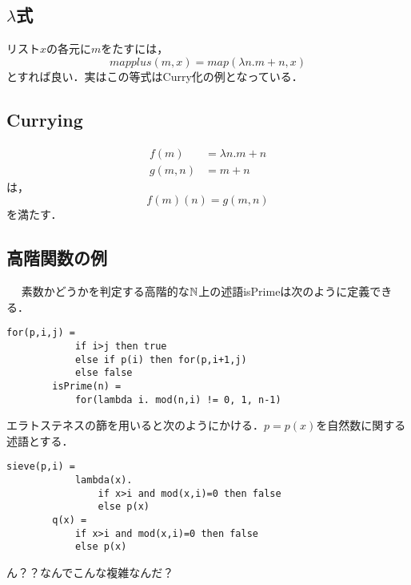 \documentclass[uplatex, 12pt, dvipdfmx]{jsreport}
\begin{document}
\subsection{$\lambda$式}

\begin{example}
    リスト$x$の各元に$m$をたすには，
    \[ mapplus(m,x) = map(\lambda n.m+n,x) \]
    とすれば良い．実はこの等式はCurry化の例となっている．
\end{example}

\subsection{Currying}

\begin{definition}[Currying]
\begin{align*}
    f(m) &= \lambda n.m+n\\
    g(m,n) &= m+n
\end{align*}
は，
\[ f(m)(n) = g(m,n) \]
を満たす．
\end{definition}

\subsection{高階関数の例}

\begin{example}　
    素数かどうかを判定する高階的な$\mathbb{N}$上の述語isPrimeは次のように定義できる．
    \begin{lstlisting}[caption=isPrime]
        for(p,i,j) =
            if i>j then true
            else if p(i) then for(p,i+1,j)
            else false
        isPrime(n) =
            for(lambda i. mod(n,i) != 0, 1, n-1)
    \end{lstlisting}
    エラトステネスの篩を用いると次のようにかける．$p=p(x)$を自然数に関する述語とする．
    \begin{lstlisting}[caption=Sieve of Eratosthenes]
        sieve(p,i) =
            lambda(x).
                if x>i and mod(x,i)=0 then false
                else p(x)
        q(x) =
            if x>i and mod(x,i)=0 then false
            else p(x)
    \end{lstlisting}
    ん？？なんでこんな複雑なんだ？
\end{example}

\begin{example}[行列]
    
\end{example}
\end{document}
